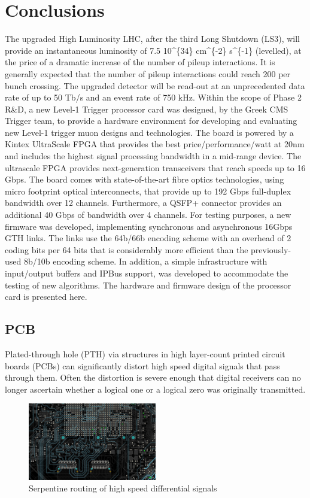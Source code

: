 \documentclass[a4paper]{PoS}
\begin{document}
\section{Conclusions}
The upgraded High Luminosity LHC, after the third Long Shutdown (LS3), will provide an instantaneous luminosity of 7.5 10\^{}\{34\} cm\^{}\{-2\} s\^{}\{-1\} (levelled), at the price of a dramatic increase of the number of pileup interactions. It is generally expected that the number of pileup interactions could reach 200 per bunch crossing. The upgraded detector will be read-out at an unprecedented data rate of up to 50 Tb/s and an event rate of 750 kHz. Within the scope of Phase 2 R\&D, a new Level-1 Trigger processor card was designed, by the Greek CMS Trigger team, to provide a hardware environment for developing and evaluating new Level-1 trigger muon designs and technologies. The board is powered by a Kintex UltraScale FPGA that provides the best price/performance/watt at 20nm and includes the highest signal processing bandwidth in a mid-range device. The ultrascale FPGA provides next-generation transceivers that reach speeds up to 16 Gbps. The board comes with state-of-the-art fibre optics technologies, using micro footprint optical interconnects, that provide up to 192 Gbps full-duplex bandwidth over 12 channels. Furthermore, a QSFP+ connector provides an additional 40 Gbps of bandwidth over 4 channels. For testing purposes, a new firmware was developed, implementing synchronous and asynchronous 16Gbps GTH links. The links use the 64b/66b encoding scheme with an overhead of 2 coding bits per 64 bits that is considerably more efficient than the previously-used 8b/10b encoding scheme. In addition, a simple infrastructure with input/output buffers and IPBus support, was developed to accommodate the testing of new algorithms. The hardware and firmware design of the processor card is presented here.


\subsection{PCB}
Plated-through hole (PTH) via structures in high layer-count printed circuit boards (PCBs) can significantly distort high speed digital signals that pass through them. Often the  distortion is severe enough that digital receivers can no longer ascertain whether a  logical one or a logical zero was originally transmitted. 

\begin{figure}
\centering
\includegraphics[width=0.5\textwidth]{serpentine_routing.png}
\caption{Serpentine routing of high speed differential signals}
\label{fig3}
\end{figure}
\end{document}
